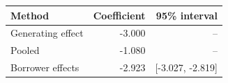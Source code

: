 \begin{tabular}{@{}lrr@{}}
\toprule
Method & Coefficient & 95\% interval\\
\midrule
Generating effect & -3.000 & --\\
Pooled & -1.080 & --\\
Borrower effects & -2.923 & [-3.027, -2.819]\\
\bottomrule
\end{tabular}
